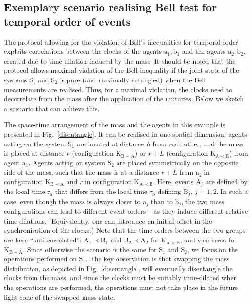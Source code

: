 \documentclass[a4paper,11pt]{article}
\begin{document}
\subsection*{Exemplary scenario realising Bell test for temporal order of events}
\label{app:disentangle}

The protocol allowing for the violation of Bell's inequalities for temporal order exploits correlations between the clocks of the agents $\mathrm{a_1, b_1}$ and the agents $\mathrm{a_2, b_2}$, created due to time dilation induced by the mass. {It should be noted that} the protocol allows maximal violation of the Bell inequality if the joint state of the systems $\mathrm S_1$ and $\mathrm S_2$ is pure {(and maximally entangled)} when the Bell measurements are realised. Thus, for a maximal violation,  the clocks need to decorrelate from the mass  after the application of the unitaries. Below we sketch a scenario that can achieve this.
%

The space-time arrangement of the mass and the agents in this example is presented in Fig.~\ref{disentangle}. It can be realised in one spatial dimension:  agents acting on the system $\mathrm S_1$ are located at distance $h$ from each other, and the mass is placed at distance $r$ (configuration $\mathrm{K_{B\prec A}}$) or $r+L$ (configuration $\mathrm{K_{A\prec B}}$) from agent $\mathrm a_1$. Agents acting on system $\mathrm S_2$ are placed symmetrically on the opposite side of the mass, such that the mass is at a distance $r+L$ from $\mathrm a_2$ in configuration $\mathrm{K_{B\prec A}}$ and $r$ in configuration $\mathrm{K_{A\prec B}}$. Here, events $\mathrm{A}_j$ are defined by the local time $\tau_\mathrm{a}$ that differs from the local time $\tau_\mathrm{b}$ defining $\mathrm{B}_j$, $j=1,2$. In such a case, even though the mass is always closer to  $\mathrm{a}_j$ than to $\mathrm{b}_j$, the two mass configurations can lead to different event orders -- as they induce different relative time dilations. (Equivalently, one can introduce an initial offset in the synchronisation of the clocks.) Note that the time orders between the two groups  are here ``anti-correlated'': $\mathrm {A_1 \prec B_1}$ and $\mathrm{B_2 \prec A_2}$ for $\mathrm{K_{A\prec B}}$, and vice versa for $\mathrm{K_{B\prec A}}$.
Since otherwise the scenario is the same for $\mathrm S_1$ and $\mathrm S_2$, we focus on the operations performed on $\mathrm S_1$.
The key observation is that swapping the mass distribution, as depicted in Fig.~\ref{disentangle}, will eventually disentangle the clocks from the mass, and since the clocks must be suitably time-dilated when the operations are performed, the operations must not take place in the future light cone of the swapped mass state.
\end{document}
